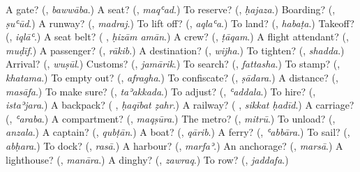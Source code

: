 \begin{tcolorbox}[breakable,colback=teal!4,colframe=teal!35!black,title={Before you move on}]
A gate? (\textbf{}, \emph{bawwāba}.) A seat? (\textbf{}, \emph{maqʿad}.) To reserve? (\textbf{}, \emph{ḥajaza}.) Boarding? (\textbf{}, \emph{ṣuʿūd}.) A runway? (\textbf{}, \emph{madraj}.) To lift off? (\textbf{}, \emph{aqlaʿa}.) To land? (\textbf{}, \emph{habaṭa}.) Takeoff? (\textbf{}, \emph{iqlāʿ}.) A seat belt? (\textbf{ }, \emph{ḥizām amān}.) A crew? (\textbf{}, \emph{ṭāqam}.) A flight attendant? (\textbf{}, \emph{muḍīf}.) A passenger? (\textbf{}, \emph{rākib}.) A destination? (\textbf{}, \emph{wijha}.) To tighten? (\textbf{}, \emph{shadda}.) Arrival? (\textbf{}, \emph{wuṣūl}.) Customs? (\textbf{}, \emph{jamārik}.) To search? (\textbf{}, \emph{fattasha}.) To stamp? (\textbf{}, \emph{khatama}.) To empty out? (\textbf{}, \emph{afragha}.) To confiscate? (\textbf{}, \emph{ṣādara}.) A distance? (\textbf{}, \emph{masāfa}.) To make sure? (\textbf{}, \emph{taʾakkada}.) To adjust? (\textbf{}, \emph{ʿaddala}.) To hire? (\textbf{}, \emph{istaʾjara}.) A backpack? (\textbf{ }, \emph{ḥaqībat ẓahr}.) A railway? (\textbf{ }, \emph{sikkat ḥadīd}.) A carriage? (\textbf{}, \emph{ʿaraba}.) A compartment? (\textbf{}, \emph{maqṣūra}.) The metro? (\textbf{}, \emph{mitrū}.) To unload? (\textbf{}, \emph{anzala}.) A captain? (\textbf{}, \emph{qubṭān}.) A boat? (\textbf{}, \emph{qārib}.) A ferry? (\textbf{}, \emph{ʿabbāra}.) To sail? (\textbf{}, \emph{abḥara}.) To dock? (\textbf{}, \emph{rasā}.) A harbour? (\textbf{}, \emph{marfaʾ}.) An anchorage? (\textbf{}, \emph{marsā}.) A lighthouse? (\textbf{}, \emph{manāra}.) A dinghy? (\textbf{}, \emph{zawraq}.) To row? (\textbf{}, \emph{jaddafa}.)
\end{tcolorbox}
